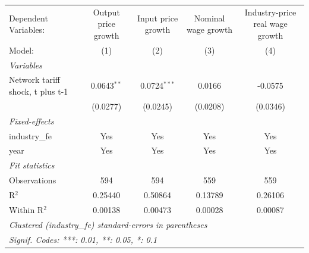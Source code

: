 \begingroup
\centering
\begin{tabular}{lcccc}
   \tabularnewline \midrule \midrule
   Dependent Variables:             & Output price growth & Input price growth & Nominal wage growth & Industry-price real wage growth\\  
   Model:                           & (1)                 & (2)                & (3)                 & (4)\\  
   \midrule
   \emph{Variables}\\
   Network tariff shock, t plus t-1 & 0.0643$^{**}$       & 0.0724$^{***}$     & 0.0166              & -0.0575\\   
                                    & (0.0277)            & (0.0245)           & (0.0208)            & (0.0346)\\   
   \midrule
   \emph{Fixed-effects}\\
   industry\_fe                     & Yes                 & Yes                & Yes                 & Yes\\  
   year                             & Yes                 & Yes                & Yes                 & Yes\\  
   \midrule
   \emph{Fit statistics}\\
   Observations                     & 594                 & 594                & 559                 & 559\\  
   R$^2$                            & 0.25440             & 0.50864            & 0.13789             & 0.26106\\  
   Within R$^2$                     & 0.00138             & 0.00473            & 0.00028             & 0.00087\\  
   \midrule \midrule
   \multicolumn{5}{l}{\emph{Clustered (industry\_fe) standard-errors in parentheses}}\\
   \multicolumn{5}{l}{\emph{Signif. Codes: ***: 0.01, **: 0.05, *: 0.1}}\\
\end{tabular}
\par\endgroup
